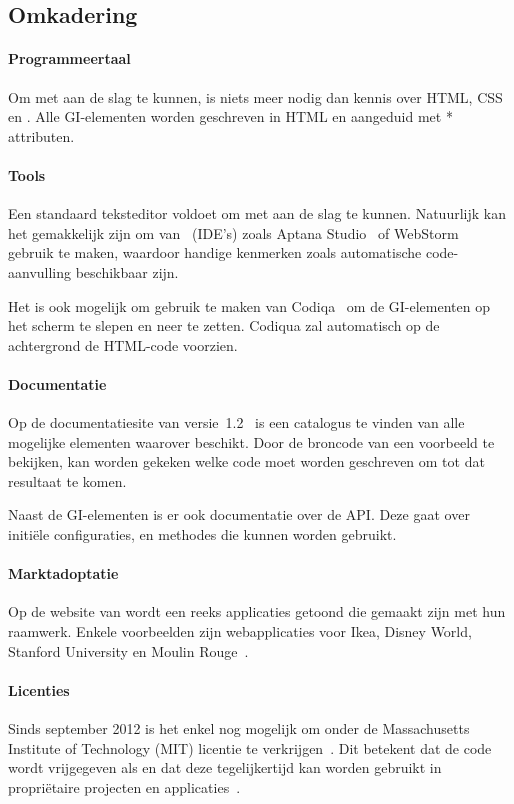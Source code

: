 \subsection{Omkadering}
\paragraph{Programmeertaal}
Om met \jqm{} aan de slag te kunnen, is niets meer nodig dan kennis over HTML, CSS en \js{}. 
Alle GI-elementen worden geschreven in HTML en aangeduid met * attributen.

\paragraph{Tools}
Een standaard teksteditor voldoet om met \jqm{} aan de slag te kunnen. 
Natuurlijk kan het gemakkelijk zijn om van ~(IDE's) zoals Aptana Studio~\cite{Aptana2012} of WebStorm~\cite{JetBrains2012} gebruik te maken, waardoor handige kenmerken zoals automatische code-aanvulling beschikbaar zijn.

Het is ook mogelijk om gebruik te maken van Codiqa~\cite{Sperry2012} om de GI-elementen op het scherm te slepen en neer te zetten. 
Codiqua zal automatisch op de achtergrond de HTML-code voorzien.

\paragraph{Documentatie}
Op de documentatiesite van versie~1.2~\cite{JQuery2012b} is een catalogus te vinden van alle mogelijke elementen waarover \jqm{} beschikt. 
Door de broncode van een voorbeeld te bekijken, kan worden gekeken welke code moet worden geschreven om tot dat resultaat te komen.

Naast de GI-elementen is er ook documentatie over de API. 
Deze gaat over initiële configuraties,  en methodes die kunnen worden gebruikt.

\paragraph{Marktadoptatie}
Op de website van \jqm{} wordt een reeks applicaties getoond die gemaakt zijn met hun raamwerk. 
Enkele voorbeelden zijn webapplicaties voor Ikea, Disney World, Stanford University en Moulin Rouge~\cite{JQuery2012a}. 

\paragraph{Licenties}
Sinds september 2012 is het enkel nog mogelijk om \jqm{} onder de Massachusetts Institute of Technology (MIT) licentie te verkrijgen~\cite{Dmethvin2012}. 
Dit betekent dat de code wordt vrijgegeven als  en dat deze tegelijkertijd kan worden gebruikt in propriëtaire projecten en applicaties~\cite{PhilDutson2012}.

